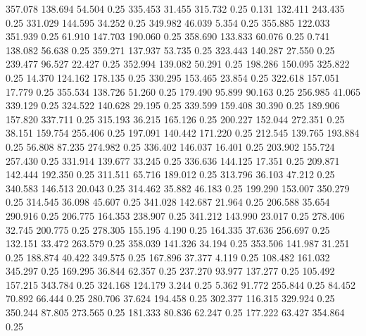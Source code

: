  357.078  138.694   54.504         0.25
 335.453   31.455  315.732         0.25
   0.131  132.411  243.435         0.25
 331.029  144.595   34.252         0.25
 349.982   46.039    5.354         0.25
 355.885  122.033  351.939         0.25
  61.910  147.703  190.060         0.25
 358.690  133.833   60.076         0.25
   0.741  138.082   56.638         0.25
 359.271  137.937   53.735         0.25
 323.443  140.287   27.550         0.25
 239.477   96.527   22.427         0.25
 352.994  139.082   50.291         0.25
 198.286  150.095  325.822         0.25
  14.370  124.162  178.135         0.25
 330.295  153.465   23.854         0.25
 322.618  157.051   17.779         0.25
 355.534  138.726   51.260         0.25
 179.490   95.899   90.163         0.25
 256.985   41.065  339.129         0.25
 324.522  140.628   29.195         0.25
 339.599  159.408   30.390         0.25
 189.906  157.820  337.711         0.25
 315.193   36.215  165.126         0.25
 200.227  152.044  272.351         0.25
  38.151  159.754  255.406         0.25
 197.091  140.442  171.220         0.25
 212.545  139.765  193.884         0.25
  56.808   87.235  274.982         0.25
 336.402  146.037   16.401         0.25
 203.902  155.724  257.430         0.25
 331.914  139.677   33.245         0.25
 336.636  144.125   17.351         0.25
 209.871  142.444  192.350         0.25
 311.511   65.716  189.012         0.25
 313.796   36.103   47.212         0.25
 340.583  146.513   20.043         0.25
 314.462   35.882   46.183         0.25
 199.290  153.007  350.279         0.25
 314.545   36.098   45.607         0.25
 341.028  142.687   21.964         0.25
 206.588   35.654  290.916         0.25
 206.775  164.353  238.907         0.25
 341.212  143.990   23.017         0.25
 278.406   32.745  200.775         0.25
 278.305  155.195    4.190         0.25
 164.335   37.636  256.697         0.25
 132.151   33.472  263.579         0.25
 358.039  141.326   34.194         0.25
 353.506  141.987   31.251         0.25
 188.874   40.422  349.575         0.25
 167.896   37.377    4.119         0.25
 108.482  161.032  345.297         0.25
 169.295   36.844   62.357         0.25
 237.270   93.977  137.277         0.25
 105.492  157.215  343.784         0.25
 324.168  124.179    3.244         0.25
   5.362   91.772  255.844         0.25
  84.452   70.892   66.444         0.25
 280.706   37.624  194.458         0.25
 302.377  116.315  329.924         0.25
 350.244   87.805  273.565         0.25
 181.333   80.836   62.247         0.25
 177.222   63.427  354.864         0.25
